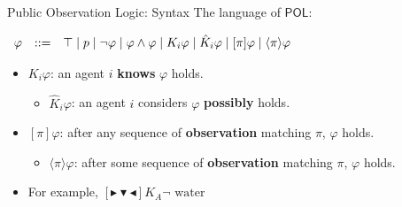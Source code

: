 \documentclass[usenames,dvipsnames]{beamer}
\newcommand\ldiaarg[1]{\langle#1\rangle}
\newcommand{\POL}{\mathsf{POL}}
\newcommand{\ep}{\ensuremath{\varepsilon}}
\newcommand{\obsright}{\blacktriangleright}
\newcommand{\obsleft}{\blacktriangleleft}
\newcommand{\obsdown}{\blacktriangledown}
\renewcommand{\phi}{\varphi}
\begin{document}
\begin{frame}{Public Observation Logic: Syntax\footnotemark[1]}
The language of $\POL$:
\vspace{.1cm}
			
		     $\begin{array}{r@{\quad::= \quad}l}
				\phi  &
				\top
				\mid
				p
				\mid \neg \phi
				\mid \phi \land \phi
				\mid K_i\phi
				\mid \hat{K}_i \phi
				\mid [\pi] \phi
				\mid \ldiaarg{\pi} \phi
			\end{array}$
			
			\vspace{.1cm}
    \begin{itemize}
        \item<2-> $K_i\varphi$: an agent $i$ \textbf{knows} $\varphi$ holds.
        \vspace{.1cm}
        \begin{itemize}
            \item<3-> $\hat{K}_i\phi$: an agent $i$ considers $\varphi$ \textbf{possibly} holds.
        \end{itemize}
        \vspace{.1cm}
        \item<4-> $[\pi]\varphi$: after any sequence of \textbf{observation} matching $\pi$, $\varphi$ holds.
        \vspace{.1cm}
        \begin{itemize}
            \item<5-> $\ldiaarg{\pi}\phi$: after some sequence of \textbf{observation} matching $\pi$, $\varphi$ holds.
        \end{itemize}
        \vspace{.1cm}
        \item<6-> For example, $[\obsright\obsdown\obsleft] K_A \neg \textrm{ water }$
    \end{itemize}
\end{frame}

        
\end{document}
